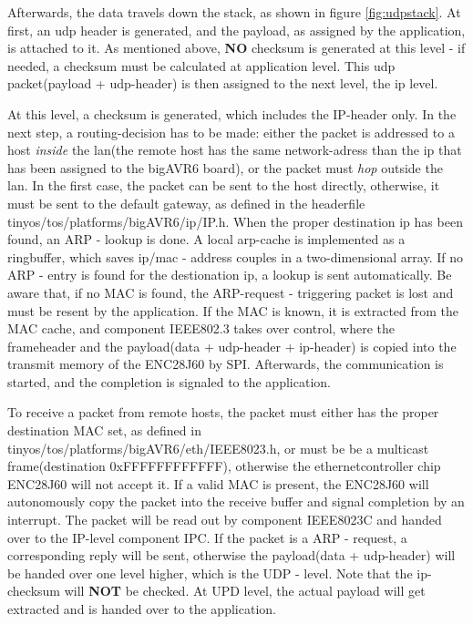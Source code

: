 Afterwards, the data travels down the stack, as shown in figure \ref{fig:udpstack}. At first, an udp header is generated, and the payload, as assigned by the application, is attached to it. As mentioned above, \textbf{NO} checksum is generated at this level - if needed, a checksum must be calculated at application level. This udp packet(payload + udp-header) is then assigned to the next level, the ip level.

At this level, a checksum is generated, which includes the IP-header only. In the next step, a routing-decision has to be made: either the packet is addressed to a host \textit{inside} the lan(the remote host has the same network-adress than the ip that has been assigned to the bigAVR6 board), or the packet must \textit{hop} outside the lan. In the first case, the packet can be sent to the host directly, otherwise, it must be sent to the default gateway, as defined in the headerfile tinyos/tos/platforms/bigAVR6/ip/IP.h. When the proper destination ip has been found, an ARP - lookup is done. A local arp-cache is implemented as a ringbuffer, which saves ip/mac - address couples in a two-dimensional array. If no ARP - entry is found for the destionation ip, a lookup is sent automatically. Be aware that, if no MAC is found, the ARP-request - triggering packet is lost and must be resent by the application. If the MAC is known, it is extracted from the MAC cache, and component IEEE802.3 takes over control, where the frameheader and the payload(data + udp-header + ip-header) is copied into the transmit memory of the ENC28J60 by SPI. Afterwards, the communication is started, and the completion is signaled to the application.

To receive a packet from remote hosts, the packet must either has the proper destination MAC set, as defined in tinyos/tos/platforms/bigAVR6/eth/IEEE8023.h, or must be be a multicast frame(destination 0xFFFFFFFFFFFF), otherwise the ethernetcontroller chip ENC28J60 will not accept it. If a valid MAC is present, the ENC28J60 will autonomously copy the packet into the receive buffer and signal completion by an interrupt. The packet will be read out by component IEEE8023C and handed over to the IP-level component IPC. If the packet is a ARP - request, a corresponding reply will be sent, otherwise the payload(data + udp-header) will be handed over one level higher, which is the UDP - level. Note that the ip-checksum will \textbf{NOT} be checked. At UPD level, the actual payload will get extracted and is handed over to the application.

